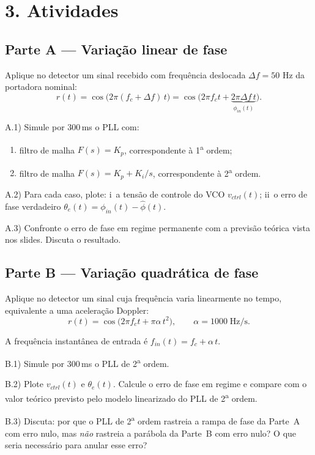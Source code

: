 \documentclass[11pt,a4paper]{article}
\begin{document}
\section*{3. Atividades}

\subsection*{Parte A --- Variação linear de fase }

Aplique no detector um sinal recebido com frequência deslocada $\Delta f = 50$ Hz da portadora
nominal:
\[
  r(t) = \cos\!\bigl(2\pi (f_c+\Delta f)\,t\bigr) = \cos\!\bigl(2\pi f_c t + \underbrace{2\pi\Delta f\,t}_{\phi_{in}(t)}\bigr).
\]

A.1) Simule por $300\,$ms o PLL com:
\begin{enumerate}[label=(\alph*),leftmargin=2em]
  \item filtro de malha $F(s)=K_p$, correspondente à 1\textsuperscript{a} ordem;
  \item filtro de malha $F(s)=K_p+K_i/s$, correspondente à 2\textsuperscript{a} ordem.
\end{enumerate}

A.2) Para cada caso, plote: i~a tensão de controle do VCO $v_{ctrl}(t)$;
ii~o erro de fase verdadeiro $\theta_e(t) = \phi_{in}(t) - \hat\phi(t)$.

A.3) Confronte o erro de fase em regime permanente com a previsão teórica vista nos slides.
Discuta o resultado.

\subsection*{Parte B --- Variação quadrática de fase}

Aplique no detector um sinal cuja frequência varia linearmente no tempo, equivalente a uma aceleração Doppler:
\[
  r(t) = \cos\!\bigl(2\pi f_c t + \pi\alpha\,t^2\bigr), \qquad \alpha = 1000\;\mathrm{Hz/s}.
\]

A frequência instantânea de entrada é $f_{in}(t) = f_c + \alpha\,t$.

B.1) Simule por $300\,$ms o PLL de 2\textsuperscript{a} ordem.

B.2) Plote $v_{ctrl}(t)$ e $\theta_e(t)$. Calcule o erro de fase em regime e compare com o
valor teórico previsto pelo modelo linearizado do PLL de 2\textsuperscript{a} ordem.

B.3) Discuta: por que o PLL de 2\textsuperscript{a} ordem rastreia a rampa de fase
da Parte~A com erro nulo, mas \emph{não} rastreia a parábola da Parte~B com erro nulo? O que seria
necessário para anular esse erro?
\end{document}
